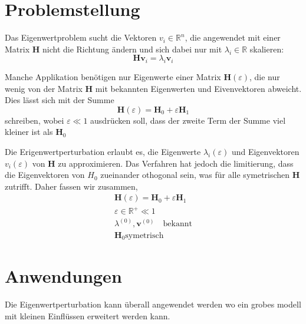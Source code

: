 %
%
%
\section{Problemstellung
\label{perturbation2:section:problemstellung}}

Das Eigenwertproblem sucht die Vektoren $v_i \in \mathbb {R}^{n} $, die angewendet mit einer Matrix $\bm H$ nicht die Richtung ändern und sich dabei nur mit $\lambda_i \in \mathbb R$ skalieren:
\begin{equation} 
    \bm H \bm v_i = \lambda_i \bm v_i
\end{equation} \label{perturbation2:eq:eig}

Manche Applikation benötigen nur Eigenwerte einer Matrix $\bm H(\varepsilon)$, die nur wenig von der Matrix $\bm H$ mit bekannten Eigenwerten und Eivenvektoren abweicht.
Dies lässt sich mit der Summe
\begin{equation}
    \bm H(\varepsilon) = \bm H_0 + \varepsilon \bm H_1
\end{equation}
schreiben, wobei $\varepsilon \ll 1 $ ausdrücken soll, dass der zweite Term der Summe viel kleiner ist als $\bm H_0$

Die Erigenwertperturbation erlaubt es, die Eigenwerte $\lambda_i(\varepsilon)$ und Eigenvektoren  $v_i(\varepsilon)$ von $\bm H$ zu approximieren.
Das Verfahren hat jedoch die limitierung, dass die Eigenvektoren von $H_0$ zueinander othogonal sein, was für alle symetrischen $\bm H$ zutrifft.
Daher fassen wir zusammen,
\begin{gather*}
    \bm H(\varepsilon) = \bm H_0 + \varepsilon \bm H_1 \\
    \varepsilon \in \mathbb{R^+} \ll 1 \\
    \lambda^{(0)}, \bm v^{(0)} \quad \text{bekannt} \\
    \bm H_0 \text{symetrisch}
\end{gather*} %



\section{Anwendungen}

Die Eigenwertperturbation kann überall angewendet werden wo ein grobes modell mit kleinen Einflüssen erweitert werden kann.

